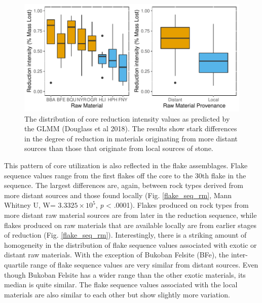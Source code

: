\documentclass[]{elsarticle} %
\makeatletter
\def\maxwidth{\ifdim\Gin@nat@width>\linewidth\linewidth
\else\Gin@nat@width\fi}
\let\Oldincludegraphics\includegraphics
\renewcommand{\includegraphics}[1]{\Oldincludegraphics[width=\maxwidth]{#1}}
\makeatother
\begin{document}
\begin{figure}
\centering
\includegraphics{HUMEV-D-20-00115_revised_draft_files/figure-latex/fig-3-1.pdf}
\caption{The distribution of core reduction intensity values as
predicted by the GLMM (Douglass et al 2018). The results show stark
differences in the degree of reduction in materials originating from
more distant sources than those that originate from local sources of
stone. \label{core_redux_rm}}
\end{figure}

This pattern of core utilization is also reflected in the flake
assemblages. Flake sequence values range from the first flakes off the
core to the 30th flake in the sequence. The largest differences are,
again, between rock types derived from more distant sources and those
found locally (Fig. \ref{flake_seq_rm}, Mann Whitney U, W=
\ensuremath{3.3325\times 10^{5}}, \emph{p} \textless{} .0001). Flakes
produced on rock types from more distant raw material sources are from
later in the reduction sequence, while flakes produced on raw materials
that are available locally are from earlier stages of reduction (Fig.
\ref{flake_seq_rm}). Interestingly, there is a striking amount of
homogeneity in the distribution of flake sequence values associated with
exotic or distant raw materials. With the exception of Bukoban Felsite
(BFe), the inter-quartile range of flake sequence values are very
similar from distant sources. Even though Bukoban Felsite has a wider
range than the other exotic materials, its median is quite similar. The
flake sequence values associated with the local materials are also
similar to each other but show slightly more variation.
\end{document}
